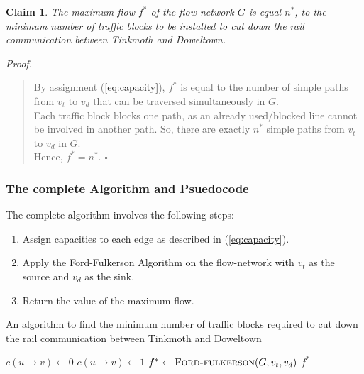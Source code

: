 \documentclass[12pt]{report}
\newtheorem{claim}{Claim}
\begin{document}
    \begin{claim}
        The maximum flow $f^{*}$ of the flow-network $G$ is equal $n^{*}$, to the minimum number of traffic blocks to be installed to cut down the
        rail communication between Tinkmoth and Doweltown.
    \end{claim}
    \textit{Proof.}
    \begin{quote}
        By assignment (\ref{eq:capacity}), $f^{*}$ is equal to the number of simple paths from $v_{t}$ to $v_{d}$ that can be traversed simultaneously in $G$. \\
        Each traffic block blocks one path, as an already used/blocked line cannot be involved in another path. So, there are exactly $n^{*}$ simple
        paths from $v_{t}$ to $v_{d}$ in $G$. \\
        Hence, $f^{*} = n^{*}$. \hfill $\square$
    \end{quote}

    \subsubsection*{The complete Algorithm and Psuedocode}
    The complete algorithm involves the following steps:
    \begin{enumerate}
        \item Assign capacities to each edge as described in (\ref{eq:capacity}).
        \item Apply the Ford-Fulkerson Algorithm on the flow-network with $v_{t}$ as the source and $v_{d}$ as the sink.
        \item Return the value of the maximum flow.
    \end{enumerate}

    \begin{algorithm}[H]
        \label{min-cut}
        \caption{An algorithm to find the minimum number of traffic blocks required to cut down the rail communication between Tinkmoth and Doweltown}
        \begin{algorithmic}[1]
                    \State $c(u \to v) \gets 0$
                \Else
                    \State $c(u \to v) \gets 1$
                \EndIf
            \EndFor
            \State $f^{*} \gets \Call{Ford-fulkerson}{G, v_{t}, v_{d}}$
            \State \Return $f^{*}$
            \EndProcedure
        \end{algorithmic}
    \end{algorithm}
\end{document}
